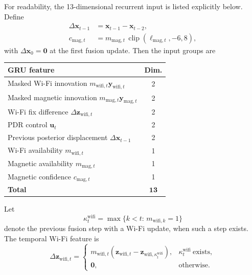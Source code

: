 \documentclass[conference]{IEEEtran}
\begin{document}
For readability, the 13-dimensional recurrent input is listed explicitly below. Define
\begin{equation}
\begin{aligned}
\Delta\mathbf{x}_{t-1}&=\mathbf{x}_{t-1}-\mathbf{x}_{t-2},\\
c_{\mathrm{mag},t}&=m_{\mathrm{mag},t}\,
\operatorname{clip}(\ell_{\mathrm{mag},t},-6,8),
\end{aligned}
\label{eq:gru_aux}
\end{equation}
with $\Delta\mathbf{x}_{0}=\mathbf{0}$ at the first fusion update.
Then the input groups are
\begin{center}
\footnotesize
\begin{tabular}{@{}lc@{}}
\toprule
\textbf{GRU feature} & \textbf{Dim.} \\ \midrule
Masked Wi-Fi innovation $m_{\mathrm{wifi},t}\mathbf{y}_{\mathrm{wifi},t}$ & 2 \\
Masked magnetic innovation $m_{\mathrm{mag},t}\mathbf{y}_{\mathrm{mag},t}$ & 2 \\
Wi-Fi fix difference $\Delta\mathbf{z}_{\mathrm{wifi},t}$ & 2 \\
PDR control $\mathbf{u}_t$ & 2 \\
Previous posterior displacement $\Delta\mathbf{x}_{t-1}$ & 2 \\
Wi-Fi availability $m_{\mathrm{wifi},t}$ & 1 \\
Magnetic availability $m_{\mathrm{mag},t}$ & 1 \\
Magnetic confidence $c_{\mathrm{mag},t}$ & 1 \\ \midrule
\textbf{Total} & $\mathbf{13}$ \\ \bottomrule
\end{tabular}
\end{center}
Let
\begin{equation}
\kappa_t^{\mathrm{wifi}}
=\max\{k<t:\,m_{\mathrm{wifi},k}=1\}
\label{eq:wifi_previous_index}
\end{equation}
denote the previous fusion step with a Wi-Fi update, when such a step exists. The temporal Wi-Fi feature is
\begin{equation}
\Delta\mathbf{z}_{\mathrm{wifi},t}=
\begin{cases}
m_{\mathrm{wifi},t}
\left(\mathbf{z}_{\mathrm{wifi},t}-
\mathbf{z}_{\mathrm{wifi},\kappa_t^{\mathrm{wifi}}}\right),
& \kappa_t^{\mathrm{wifi}}\ \text{exists},\\
\mathbf{0}, & \text{otherwise}.
\end{cases}
\label{eq:wifi_delta}
\end{equation}
\end{document}
